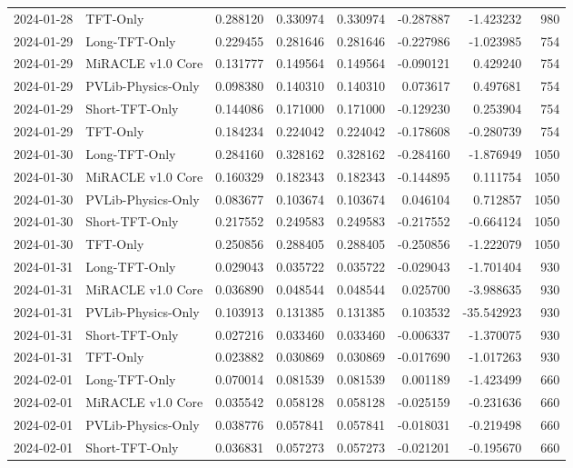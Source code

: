 \begin{tabular}{llrrrrrr}
2024-01-28 & TFT-Only & 0.288120 & 0.330974 & 0.330974 & -0.287887 & -1.423232 & 980 \\
2024-01-29 & Long-TFT-Only & 0.229455 & 0.281646 & 0.281646 & -0.227986 & -1.023985 & 754 \\
2024-01-29 & MiRACLE v1.0 Core & 0.131777 & 0.149564 & 0.149564 & -0.090121 & 0.429240 & 754 \\
2024-01-29 & PVLib-Physics-Only & 0.098380 & 0.140310 & 0.140310 & 0.073617 & 0.497681 & 754 \\
2024-01-29 & Short-TFT-Only & 0.144086 & 0.171000 & 0.171000 & -0.129230 & 0.253904 & 754 \\
2024-01-29 & TFT-Only & 0.184234 & 0.224042 & 0.224042 & -0.178608 & -0.280739 & 754 \\
2024-01-30 & Long-TFT-Only & 0.284160 & 0.328162 & 0.328162 & -0.284160 & -1.876949 & 1050 \\
2024-01-30 & MiRACLE v1.0 Core & 0.160329 & 0.182343 & 0.182343 & -0.144895 & 0.111754 & 1050 \\
2024-01-30 & PVLib-Physics-Only & 0.083677 & 0.103674 & 0.103674 & 0.046104 & 0.712857 & 1050 \\
2024-01-30 & Short-TFT-Only & 0.217552 & 0.249583 & 0.249583 & -0.217552 & -0.664124 & 1050 \\
2024-01-30 & TFT-Only & 0.250856 & 0.288405 & 0.288405 & -0.250856 & -1.222079 & 1050 \\
2024-01-31 & Long-TFT-Only & 0.029043 & 0.035722 & 0.035722 & -0.029043 & -1.701404 & 930 \\
2024-01-31 & MiRACLE v1.0 Core & 0.036890 & 0.048544 & 0.048544 & 0.025700 & -3.988635 & 930 \\
2024-01-31 & PVLib-Physics-Only & 0.103913 & 0.131385 & 0.131385 & 0.103532 & -35.542923 & 930 \\
2024-01-31 & Short-TFT-Only & 0.027216 & 0.033460 & 0.033460 & -0.006337 & -1.370075 & 930 \\
2024-01-31 & TFT-Only & 0.023882 & 0.030869 & 0.030869 & -0.017690 & -1.017263 & 930 \\
2024-02-01 & Long-TFT-Only & 0.070014 & 0.081539 & 0.081539 & 0.001189 & -1.423499 & 660 \\
2024-02-01 & MiRACLE v1.0 Core & 0.035542 & 0.058128 & 0.058128 & -0.025159 & -0.231636 & 660 \\
2024-02-01 & PVLib-Physics-Only & 0.038776 & 0.057841 & 0.057841 & -0.018031 & -0.219498 & 660 \\
2024-02-01 & Short-TFT-Only & 0.036831 & 0.057273 & 0.057273 & -0.021201 & -0.195670 & 660 \\

\end{tabular}
